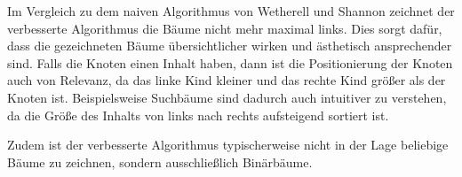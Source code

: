 Im Vergleich zu dem naiven Algorithmus von Wetherell und Shannon zeichnet der verbesserte Algorithmus die Bäume nicht mehr maximal links.
Dies sorgt dafür, dass die gezeichneten Bäume übersichtlicher wirken und ästhetisch ansprechender sind. Falls die Knoten einen Inhalt haben, dann
ist die Positionierung der Knoten auch von Relevanz, da das linke Kind kleiner und das rechte Kind größer als der Knoten ist. Beispielsweise
Suchbäume sind dadurch auch intuitiver zu verstehen, da die Größe des Inhalts von links nach rechts aufsteigend sortiert ist. 

Zudem ist der verbesserte Algorithmus typischerweise nicht in der Lage beliebige Bäume zu zeichnen, sondern ausschließlich Binärbäume.
